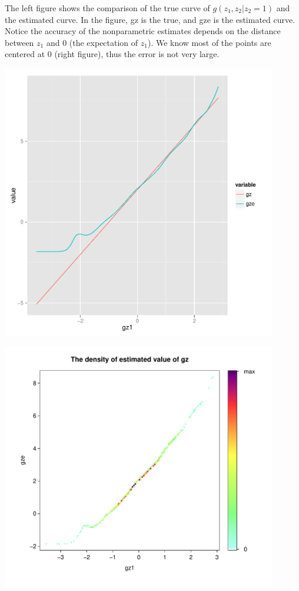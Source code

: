 \documentclass{article}
\begin{document}
The left figure shows the comparison of the true curve of $g(z_{1},z_{2}|z_{2}=1)$ and the estimated curve. In the figure, gz is the true, and gze is the estimated curve. Notice the accuracy of the nonparametric estimates depends on the distance between $z_{1}$ and 0 (the expectation of $z_{1}$). We know most of the points are centered at 0 (right figure), thus the error is not very large.

\begin{minipage}[b]{0.5\textwidth}
\centering
\includegraphics[width=0.9\textwidth]{gzeplot.pdf}
\label{fig:gzplot.pdf}
\end{minipage}
\begin{minipage}[b]{0.5\textwidth}
\centering
\includegraphics[width=0.9\textwidth]{density.pdf}
\label{fig:density.pdf}
\end{minipage}
\end{document}
